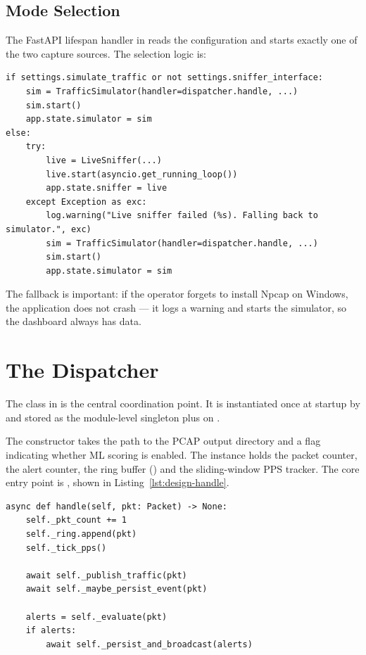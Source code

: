 \subsection{Mode Selection}
\label{sec:design-mode}

The FastAPI lifespan handler in  reads
the configuration and starts exactly one of the two capture sources.
The selection logic is:

\begin{lstlisting}[style=pyfile]
if settings.simulate_traffic or not settings.sniffer_interface:
    sim = TrafficSimulator(handler=dispatcher.handle, ...)
    sim.start()
    app.state.simulator = sim
else:
    try:
        live = LiveSniffer(...)
        live.start(asyncio.get_running_loop())
        app.state.sniffer = live
    except Exception as exc:
        log.warning("Live sniffer failed (%s). Falling back to simulator.", exc)
        sim = TrafficSimulator(handler=dispatcher.handle, ...)
        sim.start()
        app.state.simulator = sim
\end{lstlisting}

The fallback is important: if the operator forgets to install Npcap
on Windows, the application does not crash --- it logs a warning
and starts the simulator, so the dashboard always has data.

\section{The Dispatcher}
\label{sec:design-dispatcher}

The  class in
 is the central coordination
point. It is instantiated once at startup by
 and stored as the module-level
 singleton plus on .

The constructor takes the path to the PCAP output directory and a
flag indicating whether ML scoring is enabled. The instance holds
the packet counter, the alert counter, the ring buffer
() and the sliding-window PPS tracker. The
core entry point is , shown in
Listing~\ref{lst:design-handle}.

\begin{lstlisting}[style=pyfile,caption={Dispatcher entry point},label={lst:design-handle}]
async def handle(self, pkt: Packet) -> None:
    self._pkt_count += 1
    self._ring.append(pkt)
    self._tick_pps()

    await self._publish_traffic(pkt)
    await self._maybe_persist_event(pkt)

    alerts = self._evaluate(pkt)
    if alerts:
        await self._persist_and_broadcast(alerts)
\end{lstlisting}

